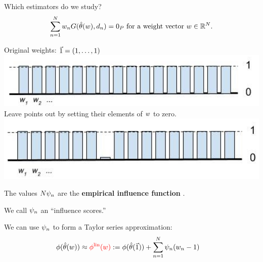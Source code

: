 \begin{frame}[t]{Which estimators do we study?}
\vspace{-2em}
\begin{align*}
%
\sumn \w_n
G(\thetahat(\w), \d_{n}) =  \zP
\textrm{ for a weight vector }\w \in \mathbb{R}^N.
%
\end{align*}
%
\begin{minipage}{0.45\textwidth}
\begin{center}
Original weights: $\vec{1} = (1,\ldots,1)$
    \includegraphics[width=1.0\textwidth]{static_figures/orig_weights}
Leave points out by setting their elements of $w$ to zero.
    \includegraphics[width=1.0\textwidth]{static_figures/weights_loo}
\end{center}
\end{minipage}
\begin{minipage}{0.45\textwidth}
\LinearGraph{}
\end{minipage}

The values $N \psi_n$ are the \textbf{empirical influence function}
\citep{hampel1986robustbook}.

We call $\psi_n$ an ``influence scores.''

\vspace{1em}
We can use $\psi_n$ to form a Taylor series approximation:
%
\begin{align*}
	\phi(\hat{\theta}(w))
		&\approx
        \color{red}
        \phi^{\mathrm{lin}}(w)
        \color{black}
		:=  \phi(\hat{\theta}(\vec{1})) +
        \sum_{n=1}^N \psi_n (w_n -1)
        \color{black}
\end{align*}

\end{frame}






